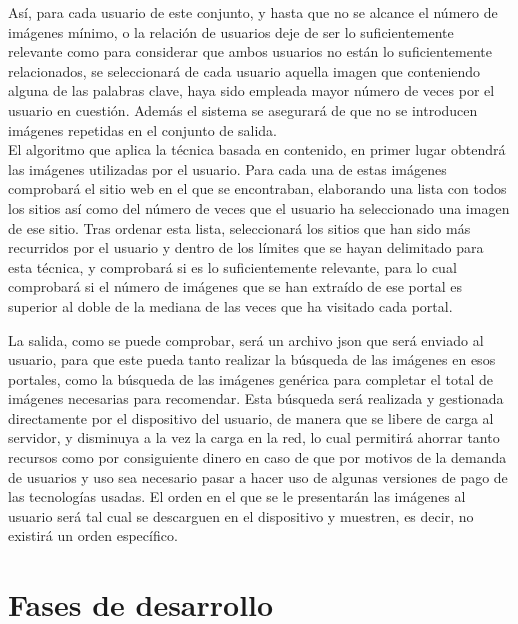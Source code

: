 Así, para cada usuario de este conjunto, y hasta que no se alcance el número de imágenes mínimo, o la relación de usuarios deje de ser lo suficientemente relevante como para considerar que ambos usuarios no están lo suficientemente relacionados, se seleccionará de cada usuario aquella imagen que conteniendo alguna de las palabras clave, haya sido empleada mayor número de veces por el usuario en cuestión. Además el sistema se asegurará de que no se introducen imágenes repetidas en el conjunto de salida.\\




El algoritmo que aplica la técnica basada en contenido, en primer lugar obtendrá las imágenes utilizadas por el usuario. Para cada una de estas imágenes comprobará el sitio web en el que se encontraban, elaborando una lista con todos los sitios así como del número de veces que el usuario ha seleccionado una imagen de ese sitio. Tras ordenar esta lista, seleccionará los sitios que han sido más recurridos por el usuario y dentro de los límites que se hayan delimitado para esta técnica, y comprobará si es lo suficientemente relevante, para lo cual comprobará si el número de imágenes que se han extraído de ese portal es superior al doble de la mediana de las veces que ha visitado cada portal.


La salida, como se puede comprobar, será un archivo json que será enviado al usuario, para que este pueda tanto realizar la búsqueda de las imágenes en esos portales, como la búsqueda de las imágenes genérica para completar el total de imágenes necesarias para recomendar. Esta búsqueda será realizada y gestionada directamente por el dispositivo del usuario, de manera que se libere de carga al servidor, y disminuya a la vez la carga en la red, lo cual permitirá ahorrar tanto recursos como por consiguiente dinero en caso de que por motivos de la demanda de usuarios y uso sea necesario pasar a hacer uso de algunas versiones de pago de las tecnologías usadas. El orden en el que se le presentarán las imágenes al usuario será tal cual se descarguen en el dispositivo y muestren, es decir, no existirá un orden específico.

\section{Fases de desarrollo}













